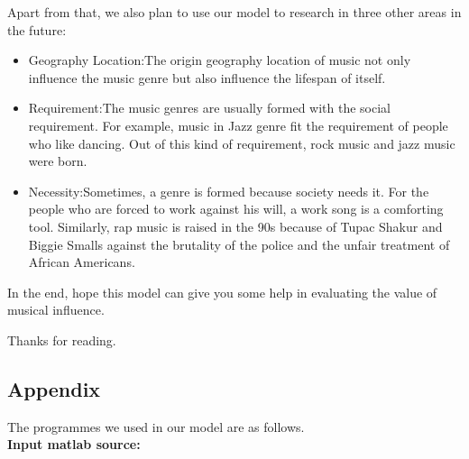 \documentclass[12pt]{article}
\begin{document}
Apart from that, we also plan to use our model to research in three other areas in the future\cite{article15}: 
\begin{itemize}
    \item Geography Location:The origin geography location of music not only influence the music genre but also influence the lifespan of itself.
    \item Requirement:The music genres are usually formed with the social requirement. For example, music in Jazz genre fit the requirement of people who like dancing. Out of this kind of requirement, rock music and jazz music were born. 
    \item Necessity:Sometimes, a genre is formed because society needs it. For the people who are forced to work against his will, a work song is a comforting tool. Similarly, rap music is raised in the 90s because of Tupac Shakur and Biggie Smalls against the brutality of the police and the unfair treatment of African Americans.
\end{itemize}

In the end, hope this model can give you some help in evaluating the value of musical influence.

Thanks for reading.




\clearpage
 


\clearpage
\begin{appendix}
\section{Appendix}
The programmes we used in our model are as follows.\\
\textbf{\textcolor[rgb]{0.98,0.00,0.00}{Input matlab source:}}




\end{appendix}
\end{document}

